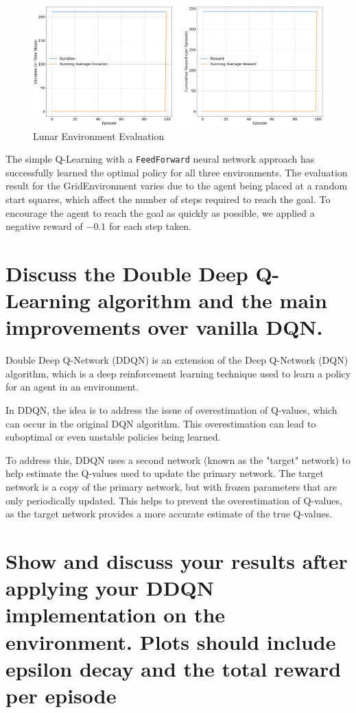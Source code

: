 \documentclass{article} %
\begin{document}
\begin{figure}[H]
    \begin{center}
        \includegraphics[width=\textwidth]{lunar_evaluate.png}
    \end{center}
    \caption{Lunar Environment Evaluation}
\end{figure}

The simple Q-Learning with a \verb|FeedForward| neural network approach has successfully learned the optimal
policy for all three environments. The evaluation result for the GridEnvironment varies
due to the agent being placed at a random start squares, which affect the number of steps
required to reach the goal. To encourage the agent to reach the goal as quickly as possible,
we applied a negative reward of $-0.1$ for each step taken.


\section{Discuss the Double Deep Q-Learning algorithm and the main improvements over vanilla DQN.}
Double Deep Q-Network (DDQN) is an extension of the Deep Q-Network (DQN) algorithm, which is a deep reinforcement learning technique used to learn a policy for an agent in an environment.

In DDQN, the idea is to address the issue of overestimation of Q-values, which can occur in the original DQN algorithm. This overestimation can lead to suboptimal or even unstable policies being learned.

To address this, DDQN uses a second network (known as the "target" network) to help estimate the Q-values used to update the primary network. The target network is a copy of the primary network, but with frozen parameters that are only periodically updated. This helps to prevent the overestimation of Q-values, as the target network provides a more accurate estimate of the true Q-values.

\section{Show and discuss your results after applying your DDQN implementation on the environment.
Plots should include epsilon decay and the total reward per episode}
\end{document}
